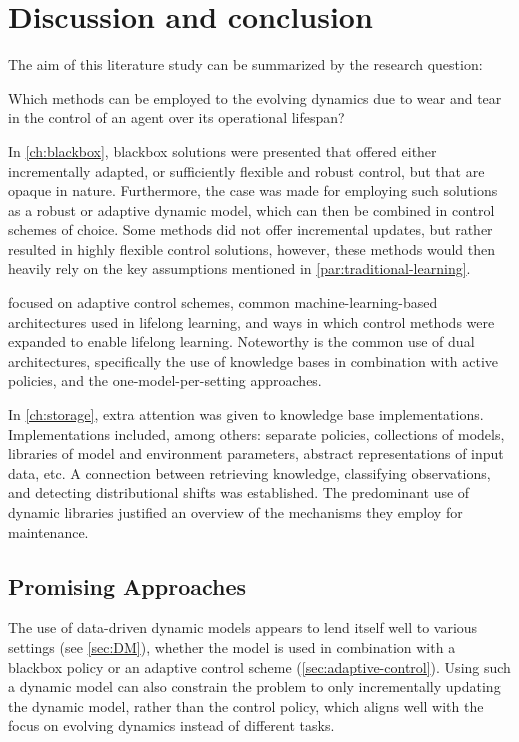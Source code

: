 \chapter{Discussion and conclusion}\label{ch:discussion}
The aim of this literature study can be summarized by the research question:

\begin{displayquote}
    Which methods can be employed to  the evolving dynamics due to wear and tear in the control of an agent over its operational lifespan?
\end{displayquote}

In \cref{ch:blackbox}, blackbox solutions were presented that offered either incrementally adapted, or sufficiently flexible and robust control, but that are opaque in nature.
Furthermore, the case was made for employing such solutions as a robust or adaptive dynamic model, which can then be combined in control schemes of choice.
Some methods did not offer incremental updates, but rather resulted in highly flexible control solutions, however, these methods would then heavily rely on the key assumptions mentioned in \cref{par:traditional-learning}.

 focused on adaptive control schemes, common machine-learning-based architectures used in lifelong learning, and ways in which control methods were expanded to enable lifelong learning.
Noteworthy is the common use of dual architectures, specifically the use of knowledge bases in combination with active policies, and the one-model-per-setting approaches.

In \cref{ch:storage}, extra attention was given to knowledge base implementations.
Implementations included, among others: separate policies, collections of models,  libraries of model and environment parameters, abstract representations of input data, etc.
A connection between retrieving knowledge, classifying observations, and detecting distributional shifts was established.
The predominant use of dynamic libraries justified an overview of the mechanisms they employ for maintenance.

\section{Promising Approaches}\label{sec:promising}
The use of data-driven dynamic models appears to lend itself well to various settings (see \cref{sec:DM}), whether the model is used in combination with a blackbox policy or an adaptive control scheme (\cref{sec:adaptive-control}).
Using such a dynamic model can also constrain the problem to only incrementally updating the dynamic model, rather than the control policy, which aligns well with the focus on evolving dynamics instead of different tasks.

